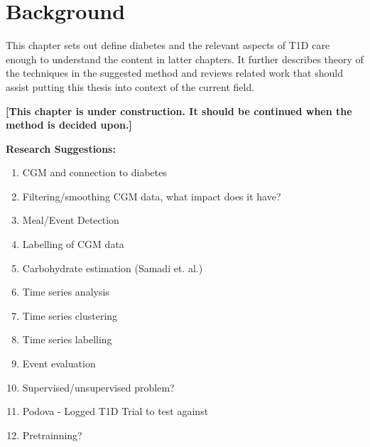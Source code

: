 \chapter{Background}

This chapter sets out define diabetes and the relevant aspects of T1D care enough to understand the content in latter chapters.
It further describes theory of the techniques in the suggested method and reviews related work that should assist putting this thesis into context of the current field.

\textbf{[This chapter is under construction. It should be continued when the method is decided upon.]}

\textbf{Research Suggestions:}

\begin{enumerate}
  \item CGM and connection to diabetes
  \item Filtering/smoothing CGM data, what impact does it have?
  \item Meal/Event Detection
  \item Labelling of CGM data
  \item Carbohydrate estimation (Samadi et. al.)
  \item Time series analysis
  \item Time series clustering
  \item Time series labelling
  \item Event evaluation
  \item Supervised/unsupervised problem?
  \item Podova - Logged T1D Trial to test against
  \item Pretrainning?
\end{enumerate}

%
%
%
%
%
%
%
